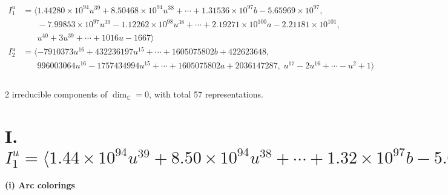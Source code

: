 \documentclass[1p]{elsarticle_modified}
\theoremstyle{definition}
\begin{document}
\begin{align*}
I^u_{1}&=\langle 
1.44280\times10^{94} u^{39}+8.50468\times10^{94} u^{38}+\cdots+1.31536\times10^{97} b-5.65969\times10^{97},\\
\phantom{I^u_{1}}&\phantom{= \langle  }-7.99853\times10^{97} u^{39}-1.12262\times10^{98} u^{38}+\cdots+2.19271\times10^{100} a-2.21181\times10^{101},\\
\phantom{I^u_{1}}&\phantom{= \langle  }u^{40}+3 u^{39}+\cdots+1016 u-1667\rangle \\
I^u_{2}&=\langle 
-7910373 u^{16}+432236197 u^{15}+\cdots+1605075802 b+422623648,\\
\phantom{I^u_{2}}&\phantom{= \langle  }996003064 u^{16}-1757434994 u^{15}+\cdots+1605075802 a+2036147287,\;u^{17}-2 u^{16}+\cdots- u^2+1\rangle \\
\\
\end{align*}
\raggedright * 2 irreducible components of $\dim_{\mathbb{C}}=0$, with total 57 representations.\\
\newpage
\renewcommand{\arraystretch}{1}
\centering \section*{I. $I^u_{1}= \langle 1.44\times10^{94} u^{39}+8.50\times10^{94} u^{38}+\cdots+1.32\times10^{97} b-5.66\times10^{97},\;-8.00\times10^{97} u^{39}-1.12\times10^{98} u^{38}+\cdots+2.19\times10^{100} a-2.21\times10^{101},\;u^{40}+3 u^{39}+\cdots+1016 u-1667 \rangle$}
\flushleft \textbf{(i) Arc colorings}\\
\end{document}
